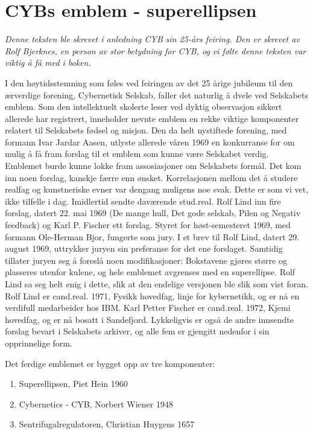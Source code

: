 \documentclass[../../main.tex]{subfiles}
\begin{document}
\chapter{CYBs emblem - superellipsen}

\emph{Denne teksten ble skrevet i anledning CYB sin 25-års feiring. Den er skrevet av Rolf Bjerknes, en person av stor betydning for CYB, og vi følte denne teksten var viktig å få med i boken.}

\author{Rolf Bjerknes}

I den høytidsstemning som føles ved feiringen av det 25 årige jubileum til den ærverdige forening, Cybernetisk Selskab, faller det naturlig å dvele ved Selskabets emblem. Som den intellektuelt skolerte leser ved dyktig observasjon sikkert allerede har registrert, inneholder nevnte emblem en rekke viktige komponenter relatert til Selskabets fødsel og misjon. Den da helt nystiftede forening, med formann Ivar Jardar Aasen, utlyste allerede våren 1969 en konkurranse for om mulig å få fram forslag til et emblem som kunne være Selskabet verdig. Emblemet burde kunne lokke fram assosiasjoner om Selskabets formål. Det kom inn noen forslag, kanskje færre enn ønsket. Korrelasjonen mellom det å studere realfag og kunstneriske evner var dengang muligens noe svak. Dette er som vi vet, ikke tilfelle i dag. Imidlertid sendte daværende stud.real. Rolf Lind inn fire forslag, datert 22. mai 1969 (De mange hull, Det gode selskab, Pilen og Negativ feedback) og Karl P. Fischer ett forslag. Styret for høst-semesteret 1969, med formann Ole-Herman Bjor, fungerte som jury. I et brev til Rolf Lind, datert 29. august 1969, uttrykker juryen sin preferanse for det ene forslaget. Samtidig tillater juryen seg å foreslå noen modifikasjoner: Bokstavene gjøres større og plasseres utenfor kulene, og hele emblemet avgrenses med en superellipse. Rolf Lind sa seg helt enig i dette, slik at den endelige versjonen ble slik som vist foran. Rolf Lind er cand.real. 1971, Fysikk hovedfag, linje for kybernetikk, og er nå en verdifull medarbeider hos IBM. Karl Petter Fischer er cand.real. 1972, Kjemi hovedfag, og er nå bosatt i Sandefjord. Lykkeligvis er også de andre innsendte forslag bevart i Selskabets arkiver, og alle fem er gjengitt nedenfor i sin opprinnelige form.

Det ferdige emblemet er bygget opp av tre komponenter:

\begin{enumerate}
\item Superellipsen, Piet Hein 1960
\item Cybernetics - CYB, Norbert Wiener 1948
\item Sentrifugalregulatoren, Christian Huygens 1657
\end{enumerate}
\end{document}
